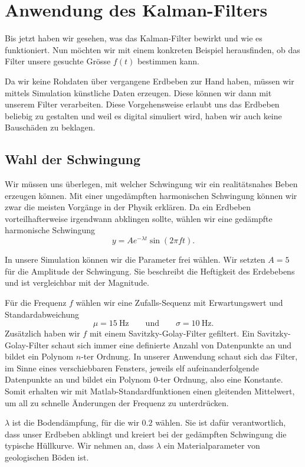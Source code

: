 \section{Anwendung des Kalman-Filters}
Bis jetzt haben wir gesehen, was das Kalman-Filter bewirkt und wie es funktioniert.
Nun möchten wir mit einem konkreten Beispiel herausfinden,
ob das Filter unsere gesuchte Grösse $f(t)$ bestimmen kann.

Da wir keine Rohdaten über vergangene Erdbeben zur Hand haben,
müssen wir mittels Simulation künstliche Daten erzeugen.
Diese können wir dann mit unserem Filter verarbeiten.
Diese Vorgehensweise erlaubt uns das Erdbeben beliebig zu gestalten
und weil es digital simuliert wird, haben wir auch keine Bauschäden zu beklagen.

\subsection{Wahl der Schwingung}
Wir müssen uns überlegen, mit welcher Schwingung wir ein realitätsnahes Beben erzeugen können.
Mit einer ungedämpften harmonischen Schwingung können wir zwar die meisten Vorgänge in der Physik erklären.
Da ein Erdbeben vorteilhafterweise irgendwann abklingen sollte,
wählen wir eine gedämpfte harmonische Schwingung
\begin{equation}
  y = A e^{-\lambda t} \sin(2\pi f t).
\end{equation}

In unsere Simulation können wir die Parameter frei wählen.
Wir setzten $A = 5$ für die Amplitude der Schwingung.
Sie beschreibt die Heftigkeit des Erdebebens und ist vergleichbar mit der Magnitude.

Für die Frequenz $f$ wählen wir eine Zufalls-Sequenz mit Erwartungswert und Standardabweichung
\begin{equation}
  \mu = \SI{15}{\hertz}
  \qquad\text{und}\qquad
  \sigma = \SI{10}{\hertz}.
\end{equation}
Zusätzlich haben wir $f$ mit einem Savitzky-Golay-Filter gefiltert.
Ein Savitzky-Golay-Filter schaut sich immer eine definierte Anzahl von Datenpunkte an
und bildet ein Polynom $n$-ter Ordnung.
In unserer Anwendung schaut sich das Filter, im Sinne eines verschiebbaren Fensters,
jeweils elf aufeinanderfolgende Datenpunkte an und bildet ein Polynom $0$-ter Ordnung,
also eine Konstante.
Somit erhalten wir mit Matlab-Standardfunktionen einen gleitenden Mittelwert,
um all zu schnelle Änderungen der Frequenz zu unterdrücken.

$\lambda$ ist die Bodendämpfung, für die wir $0.2$ wählen.
Sie ist dafür verantwortlich, dass unser Erdbeben abklingt
und kreiert bei der gedämpften Schwingung die typische Hüllkurve.
Wir nehmen an, dass $\lambda$ ein Materialparameter von geologischen Böden ist.

